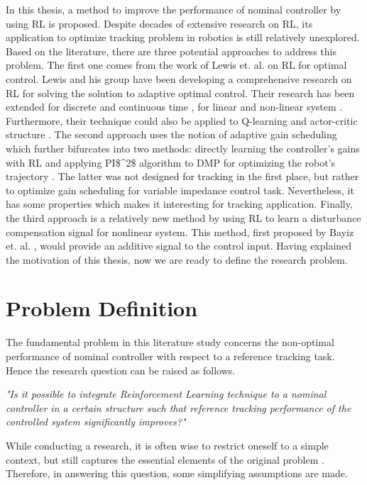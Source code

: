 In this thesis, a method to improve the performance of nominal controller by using \ac{RL} is proposed. Despite decades of extensive research on \ac{RL}, its application to optimize tracking problem in robotics is still relatively unexplored. Based on the literature, there are three potential approaches to address this problem. The first one comes from the work of Lewis et. al. on \ac{RL} for optimal control. Lewis and his group have been developing a comprehensive research on \ac{RL} for solving the solution to adaptive optimal control. Their research has been extended for discrete \cite{Kiumarsi20141167} and continuous time \cite{Modares6760477}, for linear \cite{Kiumarsi6760476} and non-linear system \cite{Kiumarsi6918527}. Furthermore, their technique could also be applied to Q-learning \cite{Kiumarsi20141167} and actor-critic structure \cite{Kiumarsi6918527}. The second approach uses the notion of adaptive gain scheduling which further bifurcates into two methods: directly learning the controller's gains with \ac {RL} \cite{Brujeni5669655} and applying \ac{PI$^2$} algorithm to \ac {DMP} for optimizing the robot's trajectory \cite{Buchli2010} \cite{Buchli6037312} . The latter was not designed for tracking in the first place, but rather to optimize gain scheduling for variable impedance control task. Nevertheless, it has some properties which makes it interesting for tracking application. Finally, the third approach is a relatively new method by using \ac{RL} to learn a disturbance compensation signal for nonlinear system. This method, first proposed by Bayiz et. al. \cite{Efe2014}, would provide an additive signal to the control input. Having explained the motivation of this thesis, now we are ready to define the research problem.



\section{Problem Definition}
The fundamental problem in this literature study concerns the non-optimal performance of nominal controller with respect to a reference tracking task. Hence the research question can be raised as follows.

\textit{"Is it possible to integrate Reinforcement Learning technique to a nominal controller in a certain structure such that reference tracking performance of the controlled system significantly improves?"}

While conducting a research, it is often wise to restrict oneself to a simple context, but still captures the essential elements of the original problem \cite{einstein}. Therefore, in answering this question, some simplifying assumptions are made.

